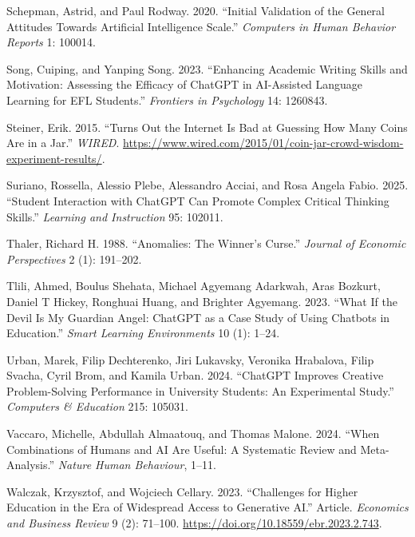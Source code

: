 \documentclass[
  12pt,
]{article}
\newlength{\cslhangindent}
\newenvironment{CSLReferences}[2] %
 {\begin{list}{}{%
  \setlength{\itemindent}{0pt}
  \setlength{\leftmargin}{0pt}
  \setlength{\parsep}{0pt}
  \ifodd #1
   \setlength{\leftmargin}{\cslhangindent}
   \setlength{\itemindent}{-1\cslhangindent}
  \fi
  \setlength{\itemsep}{#2\baselineskip}}}
 {\end{list}}
\begin{document}
\begin{CSLReferences}{1}{0}
Schepman, Astrid, and Paul Rodway. 2020. {``Initial Validation of the General Attitudes Towards Artificial Intelligence Scale.''} \emph{Computers in Human Behavior Reports} 1: 100014.

Song, Cuiping, and Yanping Song. 2023. {``Enhancing Academic Writing Skills and Motivation: Assessing the Efficacy of ChatGPT in AI-Assisted Language Learning for EFL Students.''} \emph{Frontiers in Psychology} 14: 1260843.

Steiner, Erik. 2015. {``Turns Out the Internet Is Bad at Guessing How Many Coins Are in a Jar.''} \emph{WIRED}. \url{https://www.wired.com/2015/01/coin-jar-crowd-wisdom-experiment-results/}.

Suriano, Rossella, Alessio Plebe, Alessandro Acciai, and Rosa Angela Fabio. 2025. {``Student Interaction with ChatGPT Can Promote Complex Critical Thinking Skills.''} \emph{Learning and Instruction} 95: 102011.

Thaler, Richard H. 1988. {``Anomalies: The Winner's Curse.''} \emph{Journal of Economic Perspectives} 2 (1): 191--202.

Tlili, Ahmed, Boulus Shehata, Michael Agyemang Adarkwah, Aras Bozkurt, Daniel T Hickey, Ronghuai Huang, and Brighter Agyemang. 2023. {``What If the Devil Is My Guardian Angel: ChatGPT as a Case Study of Using Chatbots in Education.''} \emph{Smart Learning Environments} 10 (1): 1--24.

Urban, Marek, Filip Dechterenko, Jiri Lukavsky, Veronika Hrabalova, Filip Svacha, Cyril Brom, and Kamila Urban. 2024. {``ChatGPT Improves Creative Problem-Solving Performance in University Students: An Experimental Study.''} \emph{Computers \& Education} 215: 105031.

Vaccaro, Michelle, Abdullah Almaatouq, and Thomas Malone. 2024. {``When Combinations of Humans and AI Are Useful: A Systematic Review and Meta-Analysis.''} \emph{Nature Human Behaviour}, 1--11.

Walczak, Krzysztof, and Wojciech Cellary. 2023. {``Challenges for Higher Education in the Era of Widespread Access to Generative AI.''} Article. \emph{Economics and Business Review} 9 (2): 71--100. \url{https://doi.org/10.18559/ebr.2023.2.743}.


\end{CSLReferences}
\end{document}
